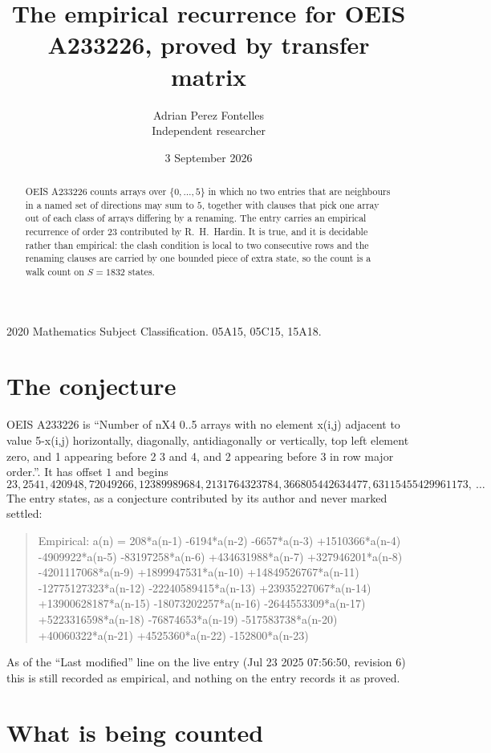 \documentclass[11pt,a4paper]{article}
\title{The empirical recurrence for OEIS A233226, proved by transfer matrix}
\author{Adrian Perez Fontelles\\ \small Independent researcher}
\date{3 September 2026}
\theoremstyle{plain}
\theoremstyle{definition}
\begin{document}
\maketitle

\begin{abstract}
OEIS A233226 counts arrays over $\{0,\dots,5\}$ in which no two entries that are neighbours in
a named set of directions may sum to $5$, together with clauses that pick one array out of
each class of arrays differing by a renaming. The entry carries an empirical recurrence of
order $23$ contributed by R.~H.~Hardin. It is true, and it is decidable rather than
empirical: the clash condition is local to two consecutive rows and the renaming clauses are
carried by one bounded piece of extra state, so the count is a walk count on $S=1832$ states.
\end{abstract}

\noindent\small 2020 Mathematics Subject Classification. 05A15, 05C15, 15A18.\normalsize

\section{The conjecture}

OEIS A233226 is ``Number of nX4 0..5 arrays with no element x(i,j) adjacent to value 5-x(i,j) horizontally, diagonally, antidiagonally or vertically, top left element zero, and 1 appearing before 2 3 and 4, and 2 appearing before 3 in row major order.''. It has offset $1$ and begins
\[
23, 2541, 420948, 72049266, 12389989684, 2131764323784, 366805442634477, 63115455429961173,\ \dots
\]
The entry states, as a conjecture contributed by its author and never marked settled:
\begin{quote}
Empirical: a(n) = 208*a(n-1) -6194*a(n-2) -6657*a(n-3) +1510366*a(n-4) -4909922*a(n-5) -83197258*a(n-6) +434631988*a(n-7) +327946201*a(n-8) -4201117068*a(n-9) +1899947531*a(n-10) +14849526767*a(n-11) -12775127323*a(n-12) -22240589415*a(n-13) +23935227067*a(n-14) +13900628187*a(n-15) -18073202257*a(n-16) -2644553309*a(n-17) +5223316598*a(n-18) -76874653*a(n-19) -517583738*a(n-20) +40060322*a(n-21) +4525360*a(n-22) -152800*a(n-23)
\end{quote}
As of the ``Last modified'' line on the live entry (Jul 23 2025 07:56:50, revision 6) this is still
recorded as empirical, and nothing on the entry records it as proved.

\section{What is being counted}
\end{document}
